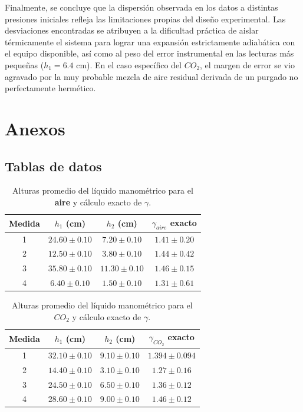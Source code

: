 \documentclass[11pt, a4paper]{article}
\begin{document}
Finalmente, se concluye que la dispersión observada en los datos a distintas presiones iniciales refleja las limitaciones propias del diseño experimental. Las desviaciones encontradas se atribuyen a la dificultad práctica de aislar térmicamente el sistema para lograr una expansión estrictamente adiabática con el equipo disponible, así como al peso del error instrumental en las lecturas más pequeñas ($h_1=6.4$ cm). En el caso específico del $CO_2$, el margen de error se vio agravado por la muy probable mezcla de aire residual derivada de un purgado no perfectamente hermético.
\newpage

\section{Anexos}

\subsection{Tablas de datos}
\label{anexo:tablas}

\begin{table}[H]
\centering
\caption{Alturas promedio del líquido manométrico para el \textbf{aire} y cálculo exacto de $\gamma$.}
\vspace{0.2cm}
\begin{tabular}{cccc}
\toprule
\textbf{Medida} & \textbf{$h_1$ (cm)} & \textbf{$h_2$ (cm)} & \textbf{$\gamma_{aire}$ exacto} \\
\midrule
1 & $24.60\pm 0.10$  & $7.20\pm 0.10$  & $1.41 \pm 0.20$ \\ 
2 & $12.50\pm 0.10$ & $3.80\pm 0.10$ & $1.44 \pm 0.42$ \\
3 & $35.80\pm 0.10$ & $11.30\pm 0.10$ & $1.46 \pm 0.15$ \\
4 & $6.40\pm 0.10$ & $1.50\pm 0.10$ & $1.31 \pm 0.61$ \\
\bottomrule
\end{tabular}
\label{tab:resultados_aire}
\end{table}

\begin{table}[H]
\centering
\caption{Alturas promedio del líquido manométrico para el \textbf{$CO_2$} y cálculo exacto de $\gamma$.}
\vspace{0.2cm}
\begin{tabular}{cccc}
\toprule
\textbf{Medida} & \textbf{$h_1$ (cm)} & \textbf{$h_2$ (cm)} & \textbf{$\gamma_{CO_2}$ exacto} \\
\midrule
1 & $32.10 \pm 0.10$ & $9.10 \pm 0.10$ & $1.394 \pm 0.094$ \\ 
2 & $14.40 \pm 0.10$ & $3.10 \pm 0.10$ & $1.27 \pm 0.16$ \\
3 & $24.50 \pm 0.10$ & $6.50 \pm 0.10$ & $1.36 \pm 0.12$ \\
4 & $28.60 \pm 0.10$ & $9.00 \pm 0.10$ & $1.46 \pm 0.12$ \\
\bottomrule
\end{tabular}
\label{tab:resultados_co2}
\end{table}
\end{document}
